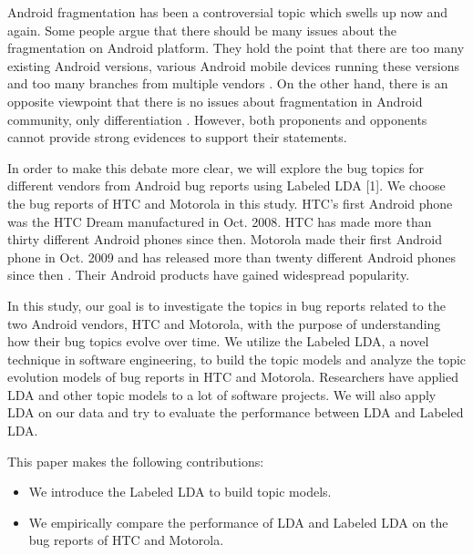 \documentclass[10pt, conference, compsocconf]{IEEEtran}
\begin{document}
Android fragmentation has been a controversial topic which swells up now and again. Some people argue that there should be many issues about the fragmentation on Android platform. They hold the point that there are too many existing Android versions, various Android mobile devices running these versions and too many branches from multiple vendors \cite{androidfragmentation}\cite{timetoendfragmentation}. On the other hand, there is an opposite viewpoint that there is no issues about fragmentation in Android community, only differentiation \cite{androidcompatibility}. However, both proponents and opponents cannot provide strong evidences to support their statements.

In order to make this debate more clear, we will explore the bug topics for different vendors from Android bug reports using Labeled LDA [1]. We choose the bug reports of HTC and Motorola in this study. HTC’s first Android phone was the HTC Dream manufactured in Oct. 2008. HTC has made more than thirty different Android phones since then. Motorola made their first Android phone in Oct. 2009 and has released more than twenty different Android phones since then . Their Android products have gained widespread popularity. 

In this study, our goal is to investigate the topics in bug reports related to the two Android vendors, HTC and Motorola, with the purpose of understanding how their bug topics evolve over time.  We utilize the Labeled LDA, a novel technique in software engineering, to build the topic models and analyze the topic evolution models\cite{Thomas:2010} of bug reports in HTC and Motorola. Researchers have applied LDA and other topic models to a lot of software projects\cite{Marcus04aninformation}\cite{Asuncion:2010}\cite{Linstead:2009}\cite{Thomas:2011}. We will also apply LDA on our data and try to evaluate the performance between LDA and Labeled LDA.

This paper makes the following contributions:

\begin{itemize}
\item We introduce the Labeled LDA to build topic models.
\end{itemize}

\begin{itemize}
\item We empirically compare the performance of LDA and Labeled LDA on the bug reports of HTC and Motorola.
\end{itemize}
\end{document}

